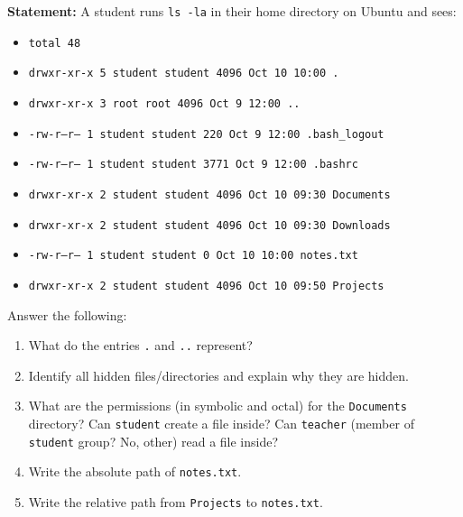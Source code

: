 \documentclass[11pt]{article}
\begin{document}
\begin{exoresolu}
\textbf{Statement:} A student runs \texttt{ls -la} in their home directory on Ubuntu and sees:
\begin{itemize}
    \item \texttt{total 48}
    \item \texttt{drwxr-xr-x 5 student student 4096 Oct 10 10:00 .}
    \item \texttt{drwxr-xr-x 3 root    root    4096 Oct  9 12:00 ..}
    \item \texttt{-rw-r--r-- 1 student student  220 Oct  9 12:00 .bash\_logout}
    \item \texttt{-rw-r--r-- 1 student student 3771 Oct  9 12:00 .bashrc}
    \item \texttt{drwxr-xr-x 2 student student 4096 Oct 10 09:30 Documents}
    \item \texttt{drwxr-xr-x 2 student student 4096 Oct 10 09:30 Downloads}
    \item \texttt{-rw-r--r-- 1 student student    0 Oct 10 10:00 notes.txt}
    \item \texttt{drwxr-xr-x 2 student student 4096 Oct 10 09:50 Projects}
\end{itemize}
Answer the following:
\begin{enumerate}
    \item What do the entries \texttt{.} and \texttt{..} represent?
    \item Identify all hidden files/directories and explain why they are hidden.
    \item What are the permissions (in symbolic and octal) for the \texttt{Documents} directory? Can \texttt{student} create a file inside? Can \texttt{teacher} (member of \texttt{student} group? No, other) read a file inside?
    \item Write the absolute path of \texttt{notes.txt}.
    \item Write the relative path from \texttt{Projects} to \texttt{notes.txt}.
\end{enumerate}


\end{exoresolu}
\end{document}

